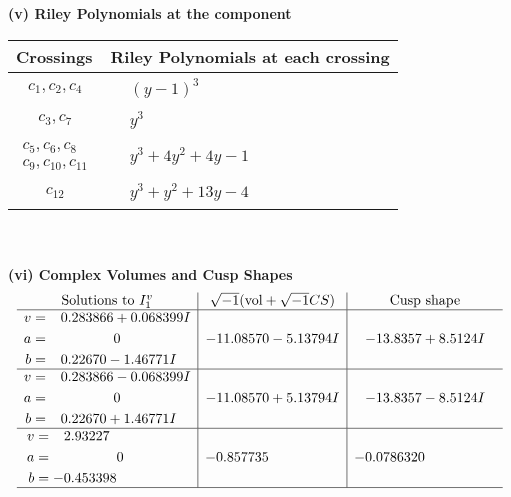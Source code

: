 \documentclass[1p]{elsarticle_modified}
\theoremstyle{definition}
\newcommand{\I}{\sqrt{-1}}
\begin{document}
\newpage\renewcommand{\arraystretch}{1}
\flushleft \textbf{(v) Riley Polynomials at the component}\newline \\
\begin{tabular}{m{50pt}|m{274pt}}
Crossings & \hspace{64pt}Riley Polynomials at each crossing \\
\hline $$\begin{aligned}c_{1},c_{2},c_{4}\end{aligned}$$&$\begin{aligned}
&(y-1)^3
\end{aligned}$\\
\hline $$\begin{aligned}c_{3},c_{7}\end{aligned}$$&$\begin{aligned}
&y^3
\end{aligned}$\\
\hline $$\begin{aligned}c_{5},c_{6},c_{8}\\c_{9},c_{10},c_{11}\end{aligned}$$&$\begin{aligned}
&y^3+4 y^2+4 y-1
\end{aligned}$\\
\hline $$\begin{aligned}c_{12}\end{aligned}$$&$\begin{aligned}
&y^3+y^2+13 y-4
\end{aligned}$\\
\hline
\end{tabular}\\~\\
\newpage\flushleft \textbf{(vi) Complex Volumes and Cusp Shapes}
$$\begin{array}{c|c|c}  
\text{Solutions to }I^v_{1}& \I (\text{vol} + \sqrt{-1}CS) & \text{Cusp shape}\\
 \hline 
\begin{aligned}
v &= \phantom{-}0.283866 + 0.068399 I \\
a &= \phantom{-0.000000 } 0 \\
b &= \phantom{-}0.22670 - 1.46771 I\end{aligned}
 & -11.08570 - 5.13794 I & -13.8357 + 8.5124 I \\ \hline\begin{aligned}
v &= \phantom{-}0.283866 - 0.068399 I \\
a &= \phantom{-0.000000 } 0 \\
b &= \phantom{-}0.22670 + 1.46771 I\end{aligned}
 & -11.08570 + 5.13794 I & -13.8357 - 8.5124 I \\ \hline\begin{aligned}
v &= \phantom{-}2.93227\phantom{ +0.000000I} \\
a &= \phantom{-0.000000 } 0 \\
b &= -0.453398\phantom{ +0.000000I}\end{aligned}
 & -0.857735\phantom{ +0.000000I} & -0.0786320\phantom{ +0.000000I}\\
 \hline 
 \end{array}$$\newpage\newpage\renewcommand{\arraystretch}{1}
\end{document}
